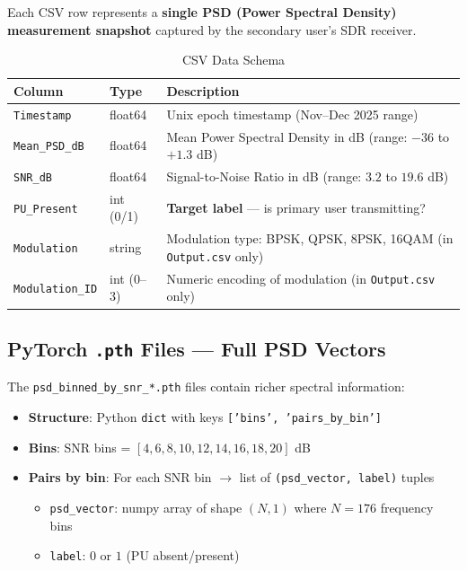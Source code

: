 \documentclass[12pt, a4paper]{article}
\begin{document}
Each CSV row represents a \textbf{single PSD (Power Spectral Density) measurement snapshot} captured by the secondary user's SDR receiver.

\begin{table}[H]
\centering
\caption{CSV Data Schema}
\label{tab:schema}
\begin{tabular}{@{}llp{7.5cm}@{}}
\toprule
\textbf{Column} & \textbf{Type} & \textbf{Description} \\
\midrule
\texttt{Timestamp}      & float64       & Unix epoch timestamp (Nov--Dec 2025 range) \\
\texttt{Mean\_PSD\_dB}  & float64       & Mean Power Spectral Density in dB (range: $-36$ to $+1.3$ dB) \\
\texttt{SNR\_dB}        & float64       & Signal-to-Noise Ratio in dB (range: $3.2$ to $19.6$ dB) \\
\texttt{PU\_Present}    & int (0/1)     & \textbf{Target label} — is primary user transmitting? \\
\texttt{Modulation}     & string        & Modulation type: BPSK, QPSK, 8PSK, 16QAM (in \texttt{Output.csv} only) \\
\texttt{Modulation\_ID} & int (0--3)    & Numeric encoding of modulation (in \texttt{Output.csv} only) \\
\bottomrule
\end{tabular}
\end{table}


\subsection{PyTorch \texttt{.pth} Files — Full PSD Vectors}

The \texttt{psd\_binned\_by\_snr\_*.pth} files contain richer spectral information:

\begin{itemize}[leftmargin=1.5em]
    \item \textbf{Structure}: Python \texttt{dict} with keys \texttt{['bins', 'pairs\_by\_bin']}
    \item \textbf{Bins}: SNR bins = $[4, 6, 8, 10, 12, 14, 16, 18, 20]$ dB
    \item \textbf{Pairs by bin}: For each SNR bin $\rightarrow$ list of \texttt{(psd\_vector, label)} tuples
    \begin{itemize}
        \item \texttt{psd\_vector}: numpy array of shape $(N, 1)$ where $N = 176$ frequency bins
        \item \texttt{label}: $0$ or $1$ (PU absent/present)
    \end{itemize}
\end{itemize}
\end{document}
